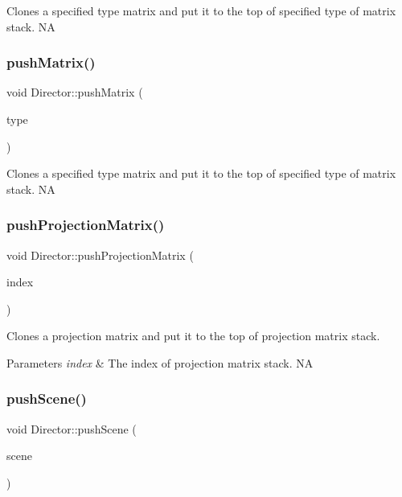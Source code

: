 Clones a specified type matrix and put it to the top of specified type of matrix stack.  NA \mbox{\label{classDirector_afbc7bc9b5641105eae937965146ea3e2}} 
\subsubsection{\texorpdfstring{push\+Matrix()}{pushMatrix()}\hspace{0.1cm}{\footnotesize\ttfamily [2/2]}}
{\footnotesize\ttfamily void Director\+::push\+Matrix (\begin{DoxyParamCaption}\item[{\hyperlink{group__base_ga4d146cef7130a8f3a953d46964ea3905}{M\+A\+T\+R\+I\+X\+\_\+\+S\+T\+A\+C\+K\+\_\+\+T\+Y\+PE}}]{type }\end{DoxyParamCaption})}

Clones a specified type matrix and put it to the top of specified type of matrix stack.  NA \mbox{\label{classDirector_ad8bff3b0904a396202573b21b0bef62b}} 
\subsubsection{\texorpdfstring{push\+Projection\+Matrix()}{pushProjectionMatrix()}}
{\footnotesize\ttfamily void Director\+::push\+Projection\+Matrix (\begin{DoxyParamCaption}\item[{size\+\_\+t}]{index }\end{DoxyParamCaption})}

Clones a projection matrix and put it to the top of projection matrix stack. 
\begin{DoxyParams}{Parameters}
{\em index} & The index of projection matrix stack.  NA \\
\hline
\end{DoxyParams}
\mbox{\label{classDirector_ad113f1a2b5ab297788caa791b57f458b}} 
\subsubsection{\texorpdfstring{push\+Scene()}{pushScene()}\hspace{0.1cm}{\footnotesize\ttfamily [1/2]}}
{\footnotesize\ttfamily void Director\+::push\+Scene (\begin{DoxyParamCaption}\item[{\hyperlink{classScene}{Scene} $\ast$}]{scene }\end{DoxyParamCaption})}

